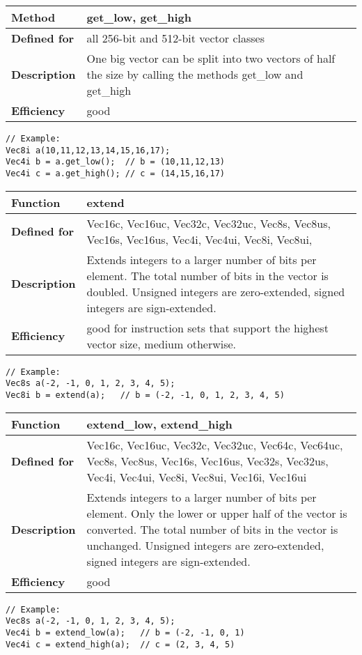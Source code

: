 \documentclass[vcl_manual.tex]{subfiles}
\begin{document}
\begin{tabular}{|p{30mm}|p{120mm}|}
\hline
\bfseries Method & get\_low, get\_high \\ \hline
\bfseries Defined for & all 256-bit and 512-bit vector classes \\ \hline
\bfseries Description & One big vector can be split into two vectors of half the size by calling the methods get\_low and get\_high \\ \hline
\bfseries Efficiency & good \\ \hline
\end{tabular}
\begin{lstlisting}[frame=none]
// Example:
Vec8i a(10,11,12,13,14,15,16,17);
Vec4i b = a.get_low();  // b = (10,11,12,13)
Vec4i c = a.get_high(); // c = (14,15,16,17)
\end{lstlisting}


\begin{tabular}{|p{30mm}|p{120mm}|}
\hline
\bfseries Function & extend \\ \hline
\bfseries Defined for & Vec16c, Vec16uc, Vec32c, Vec32uc, 
Vec8s, Vec8us, Vec16s, Vec16us,
Vec4i, Vec4ui, Vec8i, Vec8ui,  \\ \hline
\bfseries Description & Extends integers to a larger number of bits per element.
The total number of bits in the vector is doubled. 
Unsigned integers are zero-extended, signed integers are sign-extended. \\ \hline
\bfseries Efficiency & good for instruction sets that support the highest vector size, medium otherwise. \\ \hline
\end{tabular}
\begin{lstlisting}[frame=none]
// Example:
Vec8s a(-2, -1, 0, 1, 2, 3, 4, 5);
Vec8i b = extend(a);   // b = (-2, -1, 0, 1, 2, 3, 4, 5)
\end{lstlisting}


\begin{tabular}{|p{30mm}|p{120mm}|}
\hline
\bfseries Function & extend\_low, extend\_high \\ \hline
\bfseries Defined for & Vec16c, Vec16uc, Vec32c, Vec32uc, Vec64c, Vec64uc,  
Vec8s, Vec8us, Vec16s, Vec16us, Vec32s, Vec32us, 
Vec4i, Vec4ui, Vec8i, Vec8ui, Vec16i, Vec16ui \\ \hline
\bfseries Description & Extends integers to a larger number of bits per element.
Only the lower or upper half of the vector is converted. The total number of bits in the vector is unchanged. 
Unsigned integers are zero-extended, signed integers are sign-extended. \\ \hline
\bfseries Efficiency & good \\ \hline
\end{tabular}
\begin{lstlisting}[frame=none]
// Example:
Vec8s a(-2, -1, 0, 1, 2, 3, 4, 5);
Vec4i b = extend_low(a);   // b = (-2, -1, 0, 1)
Vec4i c = extend_high(a);  // c = (2, 3, 4, 5)
\end{lstlisting}
\end{document}
